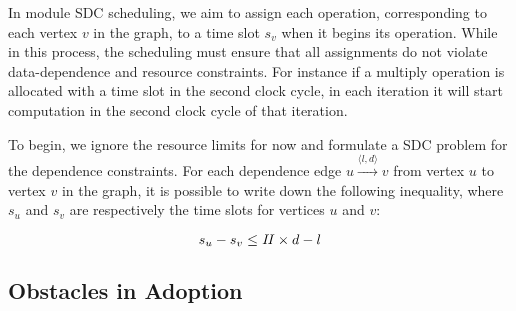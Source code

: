 In module SDC scheduling, we aim to assign each operation, corresponding
to each vertex $v$ in the graph, to a time slot $s_v$ when it begins its
operation.  While in this process, the scheduling must ensure that all
assignments do not violate data-dependence and resource constraints.  For
instance if a multiply operation is allocated with a time slot in the second
clock cycle, in each iteration it will start computation in the second clock
cycle of that iteration.

To begin, we ignore the resource limits for now and formulate a SDC problem for
the dependence constraints.  For each dependence edge $u \xrightarrow{\langle
l, d \rangle} v$ from vertex $u$ to vertex $v$ in the graph, it is possible to
write down the following inequality, where $s_u$ and $s_v$ are respectively the
time slots for vertices $u$ and $v$:

\begin{equation}
    s_u - s_v \leq \mathit{II} \times d - l
\end{equation}


\subsection{Obstacles in Adoption}
\label{sub:obstacles_in_adoption}


